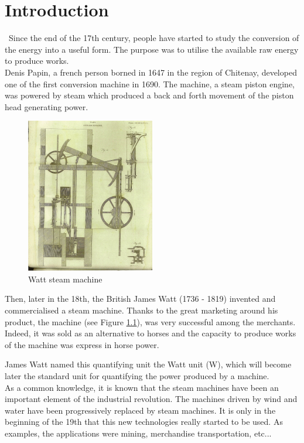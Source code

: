\chapter{Introduction}\label{introduction}
\quad\, Since the end of the 17th century, people have started to study the conversion of the energy into a useful form. The purpose was to utilise the available raw energy to produce works.\\

Denis Papin, a french person borned in 1647 in the region of Chitenay, developed one of the first conversion machine in 1690. The machine, a steam piston engine, was powered by steam which produced a back and forth movement of the piston head generating power.

\begin{figure}[h]
    \centering
    \includegraphics[width=0.5\textwidth]{Images/Introduction/WattsSteamEngine.jpeg}
    \caption{Watt steam machine\cite{Watt}}
    \label{fig:Watt}
\end{figure}

Then, later in the 18th, the British James Watt (1736 - 1819) invented and commercialised a steam machine. Thanks to the great marketing around his product, the machine (see Figure \ref{fig:Watt}), was very successful among the merchants. Indeed, it was sold as an alternative to horses and the capacity to produce works of the machine was express in horse power. 

James Watt named this quantifying unit the Watt unit (W), which will become later the standard unit for quantifying the power produced by a machine.\\

As a common knowledge, it is known that the steam machines have been an important element of the industrial revolution. The machines driven by wind and water have been progressively replaced by steam machines. It is only in the beginning of the 19th that this new technologies really started to be used. As examples, the applications were mining, merchandise transportation, etc...\\

